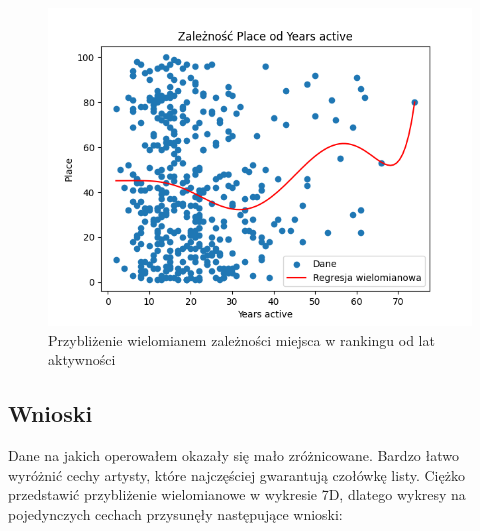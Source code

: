 \documentclass[12pt, letterpaper]{article}
\begin{document}
\begin{figure}[h]
    \centering
    \includegraphics[width=1\textwidth]{place_years_active_graph}  
    \caption{Przybliżenie wielomianem zależności miejsca w rankingu od lat aktywności}
\end{figure}

\subsection{Wnioski}

Dane na jakich operowałem okazały się mało zróżnicowane. Bardzo łatwo wyróżnić cechy artysty, które najczęściej gwarantują czołówkę listy. Ciężko przedstawić przybliżenie wielomianowe w wykresie 7D, dlatego wykresy na pojedynczych cechach przysunęły następujące wnioski:
\end{document}
